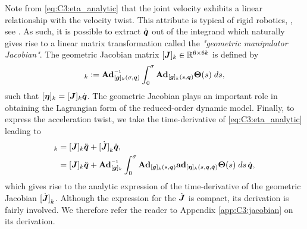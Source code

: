 %
Note from \eqref{eq:C3:eta_analytic} that the joint velocity exhibits a linear relationship with the velocity twist. This attribute is typical of rigid robotics, \eg, see \cite{Murray1994,Spong2006}. As such, it is possible to extract $\dot{{\boldsymbol{q}}}$ out of the integrand which naturally gives rise to a linear matrix transformation called the \textit{"geometric manipulator Jacobian"}. The geometric Jacobian matrix $[\boldsymbol{J}]_k \in \mathbb{R}^{6\times 6k}$ is defined by 
%
\begin{equation}
[\mat{J}]_k:= \Ad_{[\mat{g}]_k(\sigma,\q)}\inv \int_0^\sigma \Ad_{[\mat{g}]_k(s,\q)} \mat{\Theta}(s) \; ds, \label{eq:C3:jacobian_analytic}
\end{equation}
%
such that $[{\boldsymbol{\eta}}]_k = [{\boldsymbol{J}}]_k \dot{{\boldsymbol{q}}}$. The geometric Jacobian plays an important role in obtaining the Lagrangian form of the reduced-order dynamic model. Finally, to express the acceleration twist, we take the time-derivative of \eqref{eq:C3:eta_analytic} leading to
%
\begin{align}
[\dot{\vec{\eta}}]_k & = [\mat{J}]_k\ddot{\vec{q}} + \dot{[\mat{J}]}_k\dot{\vec{q}}, \notag \\
& = [\mat{J}]_k\ddot{\vec{q}} + \Ad_{[\mat{g}]_k}\inv \int_0^\sigma \Ad_{[\mat{g}]_k(s,\q)} \ad_{[\vec{\eta}]_k(s,\q,\dq)} \mat{\Theta}(s) \; ds \,\dot{\q} \label{eq:C3:deta_analytic},
\end{align}
%
which gives rise to the analytic expression of the time-derivative of the geometric Jacobian $\dot{[\boldsymbol{J}]}_k$.
Although the expression for the $\dot{{\boldsymbol{J}}}$ is compact, its derivation is fairly involved. We therefore refer the reader to Appendix \ref{app:C3:jacobian} on its derivation. 
